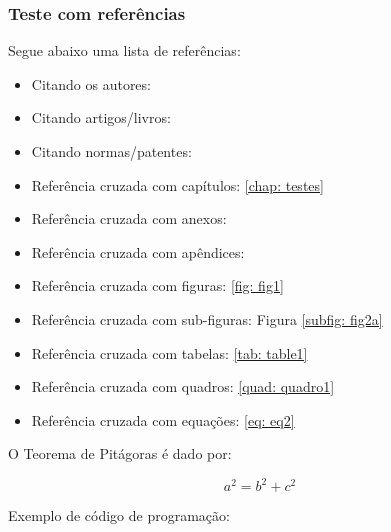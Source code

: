 \subsubsection{Teste com referências}

Segue abaixo uma lista de referências:

\begin{itemize}%
  \item Citando os autores: 
  \item Citando artigos/livros: \cite{Ciresan2012,SMIRNOV201489}
  \item Citando normas/patentes: \cite{NBR6023:2000,EHLINGER:2006:biblatex}
  \item Referência cruzada com capítulos: \autoref{chap: testes}
  \item Referência cruzada com anexos: 
  \item Referência cruzada com apêndices: 
  \item Referência cruzada com figuras: \autoref{fig: fig1}
  \item Referência cruzada com sub-figuras: Figura \ref{subfig: fig2a}
  \item Referência cruzada com tabelas: \autoref{tab: table1}
  \item Referência cruzada com quadros: \autoref{quad: quadro1}
  \item Referência cruzada com equações: \autoref{eq: eq2}
\end{itemize}
    

O Teorema de Pitágoras é dado por:

\begin{equation}
    \label{eq: eq2}
	a^{2}= b^{2}+c^{2}
\end{equation}

Exemplo de código de programação:
  
